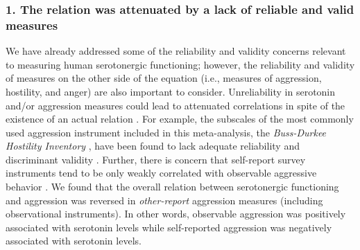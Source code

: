 \subsubsection{1. The relation was attenuated by a lack of reliable and valid measures}
We have already addressed some of the reliability and validity concerns relevant to measuring human serotonergic functioning; however, the reliability and validity of measures on the other side of the equation (i.e., measures of aggression, hostility, and anger) are also important to consider. Unreliability in serotonin and/or aggression measures could lead to attenuated correlations in spite of the existence of an actual relation \parencite{Buckley1990}. 
For example, the subscales of the most commonly used aggression instrument included in this meta-analysis, the \emph{Buss-Durkee Hostility Inventory} \parencite[BDHI;][]{Buss1957}, have been found to lack adequate reliability \parencite{Vassar2009} and discriminant validity \parencite{Biaggio1981}. Further, there is concern that self-report survey instruments tend to be only weakly correlated with observable aggressive behavior \parencite{Ferguson2009a, Gothelf1997}. We found that the overall relation between serotonergic functioning and aggression was reversed in \emph{other-report} aggression measures (including observational instruments). In other words, observable aggression was positively associated with serotonin levels while self-reported aggression was negatively associated with serotonin levels. 


